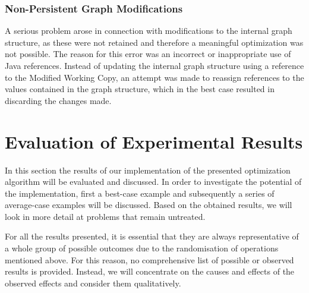 \documentclass[
	accentcolor=1c,%
	type=intern,
	marginpar=false,
	ruledheaders=section,
	class=report,
	BCOR=5mm,
      parskip=half-,
	fontsize=10pt
	]{tudapub}
\begin{document}
		\subsubsection{Non-Persistent Graph Modifications}
			A serious problem arose in connection with modifications to the internal graph structure, as these were not retained and therefore a meaningful optimization was not possible.
			The reason for this error was an incorrect or inappropriate use of Java references.
			Instead of updating the internal graph structure using a reference to the Modified Working Copy, an attempt was made to reassign references to the values contained in the graph structure, which in the best case resulted in discarding the changes made.

%


	\section{Evaluation of Experimental Results}
		In this section the results of our implementation of the presented optimization algorithm will be evaluated and discussed.
		In order to investigate the potential of the implementation, first a best-case example and subsequently a series of average-case examples will be discussed.
		Based on the obtained results, we will look in more detail at problems that remain untreated.

		For all the results presented, it is essential that they are always representative of a whole group of possible outcomes due to the randomisation of operations mentioned above.
		For this reason, no comprehensive list of possible or observed results is provided.
		Instead, we will concentrate on the causes and effects of the observed effects and consider them qualitatively.
\end{document}
